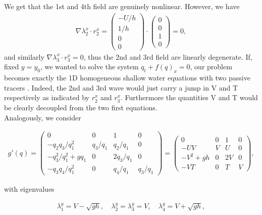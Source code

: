 \documentclass[12pt]{article}
\begin{document}
We get that the 1st and 4th field are genuinely nonlinear. However, we have
\begin{align}
    \nabla\lambda^x_2\cdot r^x_2=
            \begin{pmatrix}
                -U/h\\
                1/h\\
                0\\
                0
            \end{pmatrix}
            \cdot
            \begin{pmatrix} 
                0\\
                0\\
                1\\
                0
            \end{pmatrix}=0,
\end{align}
and similarly $\nabla \lambda^x_3 \cdot r^x_3=0$, thus the 2nd and 3rd field are linearly degenerate. If, fixed $y=y_0$, we wanted to solve the system $q_t+f(q)_x=0$, our problem becomes exactly the 1D homogeneous shallow water equations with two passive tracers \cite[Section 13.2.1]{leveque2002finite}. 
Indeed, the 2nd and 3rd wave would just carry a jump in V and T respectively as indicated by $r^x_2$ and $r^x_3$. Furthermore the quantities V and T would be clearly decoupled from the two first equations.\\

Analogously, we consider 

\begin{align}
    g'(q)=
    \begin{pmatrix}
        0 & 0 & 1 & 0\\
        -q_2 q_3/q_1^2 & q_3/q_1 & q_2/q_1 & 0\\
        -q_3^2 /q_1^2 +gq_1 & 0 & 2q_3/q_1 & 0\\
        -q_3q_4/q_1^2 & 0 & q_4/q_1 & q_3/q_1
    \end{pmatrix}
    =\begin{pmatrix}
        0 & 0 & 1 & 0\\
        -UV & V & U & 0\\
        -V^2+gh & 0 & 2V & 0\\
        -VT & 0 & T & V
    \end{pmatrix},
\end{align}

with eigenvalues

\begin{align}
    \label{eq: eigenvalues g'(q)}
    \lambda^y_1=V-\sqrt{gh}, \quad \lambda^y_2=\lambda^y_3=V,\quad \lambda^y_4=V+\sqrt{gh},
\end{align}
\end{document}
